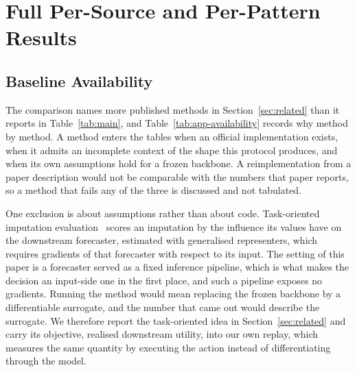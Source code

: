 \documentclass{article}
\begin{document}
\section{Full Per-Source and Per-Pattern Results}
\label{app:full-results}
\subsection{Baseline Availability}
\label{app:baseline-availability}
The comparison names more published methods in Section~\ref{sec:related} than it reports in
Table~\ref{tab:main}, and Table~\ref{tab:app-availability} records why method by method. A
method enters the tables when an official implementation exists, when it admits an incomplete
context of the shape this protocol produces, and when its own assumptions hold for a frozen
backbone. A reimplementation from a paper description would not be comparable with the numbers
that paper reports, so a method that fails any of the three is discussed and not tabulated.

One exclusion is about assumptions rather than about code. Task-oriented imputation
evaluation~\citep{wang2024taskoriented} scores an imputation by the influence its values have
on the downstream forecaster, estimated with generalised representers, which requires gradients
of that forecaster with respect to its input. The setting of this paper is a forecaster served
as a fixed inference pipeline, which is what makes the decision an input-side one in the first
place, and such a pipeline exposes no gradients. Running the method would mean replacing the
frozen backbone by a differentiable surrogate, and the number that came out would describe the
surrogate. We therefore report the task-oriented idea in Section~\ref{sec:related} and carry
its objective, realised downstream utility, into our own replay, which measures the same
quantity by executing the action instead of differentiating through the model.
\end{document}
